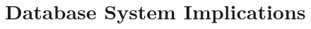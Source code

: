 \begin{comment}
http://docs.oracle.com/javaee/6/api/javax/persistence/UniqueConstraint.html

BEAN supported
https://jcp.org/en/jsr/detail?id=303

supports udf validations
http://book.cakephp.org/2.0/en/models/data-validation.html

basically you set up your own schema, but default validations don't
appear to be transactional




https://github.com/cakephp/cakephp/blob/50b3893e6507979427e1aaeb435494aed1af4f52/lib/Cake/Model/Model.php#L3303



Manually define database schema!


http://laravel.com/docs/4.2/validation#rule-unique
https://github.com/laravel/framework/blob/75b1dff27778354e44511556171cf6ae466c8b59/src/Illuminate/Validation/Validator.php#L940


http://laravelbook.com/laravel-input-validation/


Validations are handled by Anchor, a thin layer on top of Validator, one of the most robust validation libraries for Node.js. Sails supports most of the validations available in Validator, as well as a few extras that require database integration, like unique.

http://sailsjs.org/#/documentation/concepts/ORM/Validations.html
https://github.com/balderdashy/sails/issues/832

https://github.com/balderdashy/waterline

Broken in Mongo
https://github.com/balderdashy/sails-mongo/issues/152

Broken in dev
https://github.com/balderdashy/waterline/issues/55

Because you have migrate: safe set the indexes will not be created when you start the ORM.
https://github.com/balderdashy/waterline/issues/236

uses db foreign keys

\end{comment}



\section{Database System Implications}
\label{sec:discussion}

